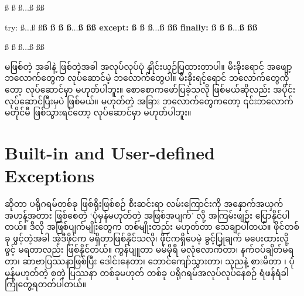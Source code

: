 \begin{multicols}{2}
\begin{py}
  ß ß
   ß$\ldots$ß
  ßß
  \end{py}
  \columnbreak
%
%
%
%
%
\begin{py}
try:
    ß$\ldots$ß
    ß\bfseries{}ß
    ß ß
     ß$\ldots$ß
    ßß
except:
    ß ß
     ß$\ldots$ß
    ßß
finally:
    ß ß
     ß$\ldots$ß
    ßß

ß ß
 ß$\ldots$ß
ßß
\end{py}
%
\end{multicols}
\noindent {} မဖြစ်တဲ့ အခါနဲ့ ဖြစ်တဲ့အခါ  အလုပ်လုပ်ပုံ နှိုင်းယှဉ်ပြထားတာပါ။ မီးခိုးရောင် အဖျော့ ဘလောက်တွေက လုပ်ဆောင်မဲ့ ဘလောက်တွေပါ။ မီးခိုးရင့်ရောင် ဘလောက်တွေကိုတော့ လုပ်ဆောင်မှာ မဟုတ်ပါဘူး။ စောစောကဖော်ပြခဲ့သလို   ဖြစ်မယ်ဆိုလည်း  အပိုင်း လုပ်ဆောင်ပြီးမှပဲ  ဖြစ်မယ်။  မဟုတ်တဲ့ အခြား ဘလောက်တွေကတော့  ၎င်းဘလောက် မတိုင်မီ   ဖြစ်သွားရင်တော့ လုပ်ဆောင်မှာ မဟုတ်ပါဘူး။




\section{Built-in and User-defined Exceptions}
 ဆိုတာ ပရိုဂရမ်တစ်ခု ဖြစ်ရိုးဖြစ်စဉ် စီးဆင်းရာ လမ်းကြောင်းကို အနှောက်အယှက် အဟန့်\allowbreak အတား ဖြစ်စေတဲ့ ‘ပုံမှန်မဟုတ်တဲ့ အဖြစ်အပျက်’ လို့ အကြမ်းဖျဉ်း ပြောနိုင်ပါတယ်။ ဒီလို အဖြစ်ပျက်မျိုးတွေက တစ်မျိုးတည်း မဟုတ်တာ သေချာပါတယ်။ ဖိုင်တစ်ခု ဖွင့်တဲ့အခါ အဲ့ဒီဖိုင်က မရှိတာဖြစ်နိုင်သလို၊ ဖိုင်ကရှိပေမဲ့ ခွင့်ပြုချက်  မပေးထားလို့ ဖွင့် မရတာလည်း ဖြစ်နိုင်တယ်။ ကွန်ပျူတာ မမ်မိုရီ မလုံလောက်တာ၊ နက်ဝပ်ချိတ်မရတာ၊ ဆာဗာပြဿနာဖြစ်ပြီး ဒေါင်းနေတာ၊  ဘောင်ကျော်သွားတာ၊ သုညနဲ့ စားမိတာ ၊ ပုံမှန်မဟုတ်တဲ့  စတဲ့ ပြဿနာ တစ်ခုမဟုတ် တစ်ခု ပရိုဂရမ်အလုပ်လုပ်နေစဉ် ရံဖန်ရံခါ ကြုံတွေ့ရတတ်ပါတယ်။

